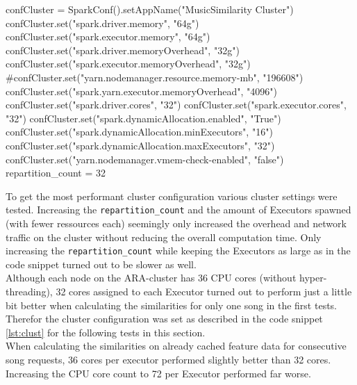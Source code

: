 \begin{pythonCode}[frame=single,label={lst:clust},caption={cluster setup},captionpos=b]
confCluster = SparkConf().setAppName("MusicSimilarity Cluster")
confCluster.set("spark.driver.memory", "64g")
confCluster.set("spark.executor.memory", "64g")
confCluster.set("spark.driver.memoryOverhead", "32g")
confCluster.set("spark.executor.memoryOverhead", "32g")
#confCluster.set("yarn.nodemanager.resource.memory-mb", "196608")
confCluster.set("spark.yarn.executor.memoryOverhead", "4096")
confCluster.set("spark.driver.cores", "32")
confCluster.set("spark.executor.cores", "32")
confCluster.set("spark.dynamicAllocation.enabled", "True")
confCluster.set("spark.dynamicAllocation.minExecutors", "16")
confCluster.set("spark.dynamicAllocation.maxExecutors", "32")
confCluster.set("yarn.nodemanager.vmem-check-enabled", "false")
repartition_count = 32
\end{pythonCode}

\noindent To get the most performant cluster configuration various cluster settings were tested. 
Increasing the \lstinline{repartition_count} and the amount of Executors spawned (with fewer ressources each) seemingly only increased the overhead and network traffic on the cluster without reducing the overall computation time. Only increasing the \lstinline{repartition_count} while keeping the Executors as large as in the code snippet turned out to be slower as well.\\ 
Although each node on the ARA-cluster has 36 CPU cores (without hyper-threading), 32 cores assigned to each Executor turned out to perform just a little bit better when calculating the similarities for only one song in the first tests. Therefor the cluster configuration was set as described in the code snippet \ref{lst:clust} for the following tests in this section.\\
When calculating the similarities on already cached feature data for consecutive song requests, 36 cores per executor performed slightly better than 32 cores. Increasing the CPU core count to 72 per Executor performed far worse.\\

                                    
